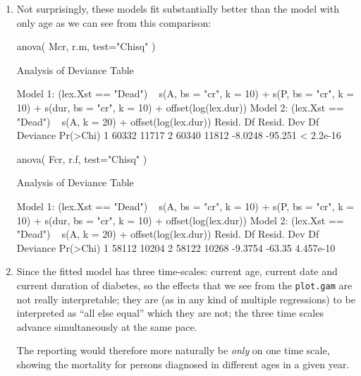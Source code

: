 \begin{enumerate}[resume]
  
\item Not surprisingly, these models fit substantially better than the
  model with only age as we can see from this comparison:
\begin{Schunk}
\begin{Sinput}
 anova( Mcr, r.m, test="Chisq" )
\end{Sinput}
\begin{Soutput}
Analysis of Deviance Table

Model 1: (lex.Xst == "Dead") ~ s(A, bs = "cr", k = 10) + s(P, bs = "cr", 
    k = 10) + s(dur, bs = "cr", k = 10) + offset(log(lex.dur))
Model 2: (lex.Xst == "Dead") ~ s(A, k = 20) + offset(log(lex.dur))
  Resid. Df Resid. Dev      Df Deviance  Pr(>Chi)
1     60332      11717                           
2     60340      11812 -8.0248  -95.251 < 2.2e-16
\end{Soutput}
\begin{Sinput}
 anova( Fcr, r.f, test="Chisq" )
\end{Sinput}
\begin{Soutput}
Analysis of Deviance Table

Model 1: (lex.Xst == "Dead") ~ s(A, bs = "cr", k = 10) + s(P, bs = "cr", 
    k = 10) + s(dur, bs = "cr", k = 10) + offset(log(lex.dur))
Model 2: (lex.Xst == "Dead") ~ s(A, k = 20) + offset(log(lex.dur))
  Resid. Df Resid. Dev      Df Deviance  Pr(>Chi)
1     58112      10204                           
2     58122      10268 -9.3754   -63.35 4.457e-10
\end{Soutput}
\end{Schunk}





\item Since the fitted model has three time-scales: current age,
  current date and current duration of diabetes, so the effects that
  we see from the \texttt{plot.gam} are not really interpretable; they
  are (as in any kind of multiple regressions) to be interpreted as
  ``all else equal'' which they are not; the three time scales
  advance simultaneously at the same pace.

  The reporting would therefore more naturally be \emph{only} on one
  time scale, showing the mortality for persons diagnosed in
  different ages in a given year.


\end{enumerate}
